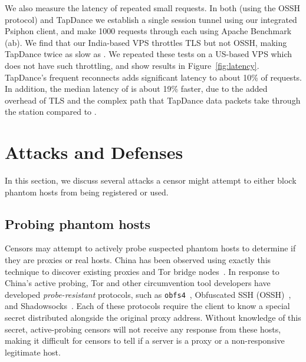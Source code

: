 \documentclass[sigconf,anonymous]{acmart}
\begin{document}
We also measure the latency of repeated small requests. In both \scheme (using
the OSSH protocol) and
TapDance we establish a single session tunnel using our integrated Psiphon
client, and make 1000 requests through each using Apache Benchmark (ab). We find
that our India-based VPS throttles TLS but not OSSH, making TapDance twice as slow as
\scheme. We repeated these tests on a US-based VPS which does not have such
throttling, and show results in Figure~\ref{fig:latency}. TapDance's frequent
reconnects adds significant latency to about 10\% of requests. In addition, the
median latency of \scheme is about 19\% faster, due to the added
overhead of TLS and the complex path that TapDance data packets take through
the station compared to \scheme.

\FigLatency







\section{Attacks and Defenses}
\label{sec:attacks}

In this section, we discuss several attacks a censor might attempt to either
block phantom hosts from being registered or used.


\subsection{Probing phantom hosts}
Censors may attempt to actively probe suspected phantom hosts to determine if
they are proxies or real hosts. China has been observed using exactly this technique to
discover existing proxies and Tor bridge
nodes~\cite{tor-bridge-blocking-blog,active-probe,ensafi-tor,china-blocking-tor}.
In response to China's active probing, Tor and other circumvention tool developers have developed
\emph{probe-resistant} protocols, such as \texttt{obfs4}~\cite{obfs4}, Obfuscated SSH
(OSSH)~\cite{ossh}, and Shadowsocks~\cite{shadowsocks}. Each of these protocols
require the client to know a special secret distributed alongside the original
proxy address. Without knowledge of this secret, active-probing censors will not
receive any response from these hosts, making it difficult for censors to tell if
a server is a proxy or a non-responsive legitimate host.
\end{document}

